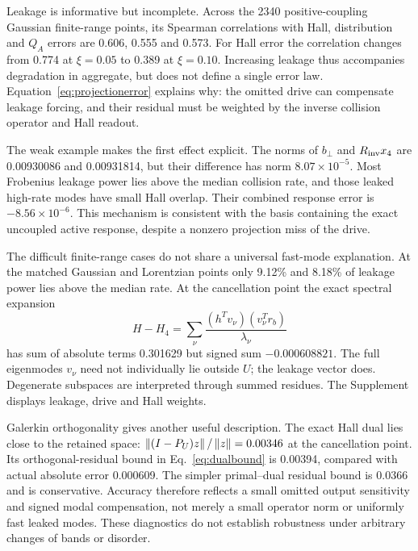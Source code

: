 Leakage is informative but incomplete. Across the 2340 positive-coupling Gaussian finite-range points, its Spearman correlations with Hall, distribution and $Q_A$ errors are 0.606, 0.555 and 0.573. For Hall error the correlation changes from 0.774 at $\xi=0.05$ to 0.389 at $\xi=0.10$. Increasing leakage thus accompanies degradation in aggregate, but does not define a single error law. Equation~\eqref{eq:projectionerror} explains why: the omitted drive can compensate leakage forcing, and their residual must be weighted by the inverse collision operator and Hall readout.

The weak example makes the first effect explicit. The norms of $b_\perp$ and $R_{\rm inv}x_4$ are 0.00930086 and 0.00931814, but their difference has norm $8.07\times10^{-5}$. Most Frobenius leakage power lies above the median collision rate, and those leaked high-rate modes have small Hall overlap. Their combined response error is $-8.56\times10^{-6}$. This mechanism is consistent with the basis containing the exact uncoupled active response, despite a nonzero projection miss of the drive.

The difficult finite-range cases do not share a universal fast-mode explanation. At the matched Gaussian and Lorentzian points only 9.12\% and 8.18\% of leakage power lies above the median rate. At the cancellation point the exact spectral expansion
\begin{equation}
H-H_4=\sum_\nu\frac{(h^Tv_\nu)(v_\nu^Tr_b)}{\lambda_\nu}
\label{eq:spectralerror}
\end{equation}
has sum of absolute terms 0.301629 but signed sum $-0.000608821$. The full eigenmodes $v_\nu$ need not individually lie outside $U$; the leakage vector does. Degenerate subspaces are interpreted through summed residues. The Supplement displays leakage, drive and Hall weights.

Galerkin orthogonality gives another useful description. The exact Hall dual lies close to the retained space: $\left\lVert(I-P_U)z\right\rVert/\left\lVert z\right\rVert=0.00346$ at the cancellation point. Its orthogonal-residual bound in Eq.~\eqref{eq:dualbound} is 0.00394, compared with actual absolute error 0.000609. The simpler primal--dual residual bound is 0.0366 and is conservative. Accuracy therefore reflects a small omitted output sensitivity and signed modal compensation, not merely a small operator norm or uniformly fast leaked modes. These diagnostics do not establish robustness under arbitrary changes of bands or disorder.

